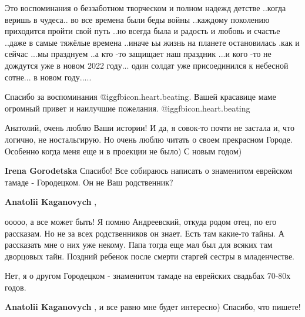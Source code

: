  
 
 
 
 
\zzSecCmt

\begin{itemize} %

Это воспоминания о беззаботном творческом и полном надежд детстве ..когда
веришь в чудеса.. во все времена были беды войны ..каждому поколению приходится
пройти свой путь ..но всегда была и радость и любовь и счастье ..даже в самые
тяжёлые времена ..иначе ьы жизнь на планете остановилась .как и сейчас ...мы
празднуем ..а кто -то защищает наш праздник ...и кого -то не дождутся уже в
новом 2022 году... один солдат уже присоединился к небесной сотне... в новом
году.....


Спасибо за воспоминания @igg{fbicon.heart.beating}. Вашей красавице маме
огромный привет и наилучшие пожелания. @igg{fbicon.heart.beating} 


Анатолий, очень люблю Ваши истории! И да, я совок-то почти не застала и, что
логично, не ностальгирую. Но очень люблю читать о своем прекрасном Городе.
Особенно когда меня еще и в проекции не было) С новым годом)

\begin{itemize} %
\textbf{Irena Gorodetska} Спасибо! Все собираюсь написать о знаменитом еврейском тамаде - Городецком. Он не Ваш родственник?

\begin{itemize} %
\textbf{Anatolii Kaganovych} , 

ооооо, а все может быть! Я помню Андреевский, откуда родом отец, по его
рассказам. Но не за всех родственников он знает. Есть там какие-то тайны. А
рассказать мне о них уже некому. Папа тогда еще мал был для всяких там
дворцовых тайн. Поздний ребенок после смерти старгей сестры в младенчестве.

Нет, я о другом Городецком - знаменитом тамаде на еврейских свадьбах 70-80х годов.

\textbf{Anatolii Kaganovych} , и все равно мне будет интересно) Спасибо, что пишете!


\end{itemize}
\end{itemize}
\end{itemize}

